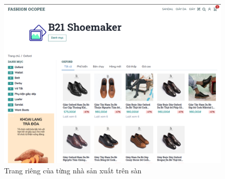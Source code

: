 \begin{figure}[h!]
	\begin{center}	
		\includegraphics[width=\textwidth]{./results/store-page}
		\caption{Trang riêng của từng nhà sản xuất trên sàn}
	\end{center}
\end{figure}